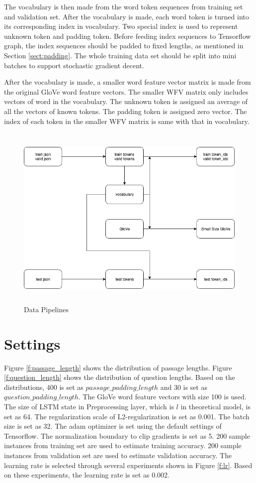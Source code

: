 \documentclass[modernstyle,12pt]{sjsuthesis}
\theoremstyle{definition}
\begin{document}
The vocabulary is then made from the word token sequences from training set and validation set. After the vocabulary is made, each word token is turned into its corresponding index in vocabulary. Two special index is used to represent unknown token and padding token. Before feeding index sequences to Tensorflow graph, the index sequences should be padded to fixed lengths, as mentioned in Section \ref{sect:padding}. The whole training data set should be split into mini batches to support stochastic gradient decent.

After the vocabulary is made, a smaller word feature vector matrix is made from the original GloVe word feature vectors. The smaller WFV matrix only includes vectors of word in the vocabulary. The unknown token is assigned an average of all the vectors of known tokens. The padding token is assigned zero vector. The index of each token in the smaller WFV matrix is same with that in vocabulary.

\begin{figure}[htbp]\centering
  \includegraphics[width=12cm, height=9cm]{figures/data.png}
  \caption{Data Pipelines}
  \label{f:data}
\end{figure}




\section{Settings}

Figure \ref{f:passage_length} shows the distribution of passage lengths. Figure \ref{f:question_length} shows the distribution of question lengths. Based on the distributions, 400 is set as $passage\_padding\_length$ and 30 is set as $question\_padding\_length$. The GloVe word feature vectors with size 100 is used. The size of LSTM state in Preprocessing layer, which is $l$ in theoretical model, is set as 64. The regularization scale of L2-regularization is set as 0.001. The batch size is set as 32. The adam optimizer is set using the default settings of Tensorflow. The normalization boundary to clip gradients is set as 5. 200 sample instances from training set are used to estimate training accuracy. 200 sample instances from validation set are used to estimate validation accuracy. The learning rate is selected through several experiments shown in Figure \ref{f:lr}. Based on these experiments, the learning rate is set as 0.002.
\end{document}
